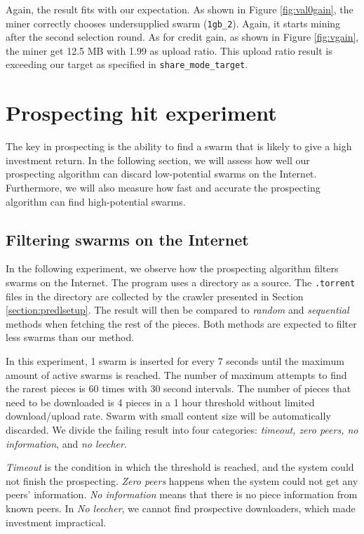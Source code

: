 Again, the result fits with our expectation. As shown in Figure \ref{fig:val0gain}, the miner correctly chooses undersupplied swarm (\texttt{1gb\_2}). Again, it starts mining after the second selection round. As for credit gain, as shown in Figure \ref{fig:vgain}, the miner get 12.5 MB with 1.99 as upload ratio. This upload ratio result is exceeding our target as specified in \texttt{share\_mode\_target}. 
\vspace{-0.3cm}
\section{Prospecting hit experiment}
\label{section:prospectexp}
The key in prospecting is the ability to find a swarm that is likely to give a high investment return. In the following section, we will assess how well our prospecting algorithm can discard low-potential swarms on the Internet. Furthermore, we will also measure how fast and accurate the prospecting algorithm can find high-potential swarms. 

\subsection{Filtering swarms on the Internet}
\label{section:filterinetexp}
In the following experiment, we observe how the prospecting algorithm filters swarms on the Internet. The program uses a directory as a source. The \texttt{.torrent} files in the directory are collected by the crawler presented in Section \ref{section:predlsetup}. The result will then be compared to \textit{random} and \textit{sequential} methods when fetching the rest of the pieces. Both methods are expected to filter less swarms than our method.


In this experiment, 1 swarm is inserted for every 7 seconds until the maximum amount of active swarms is reached. The number of maximum attempts to find the rarest pieces is 60 times with 30 second intervals. The number of pieces that need to be downloaded is 4 pieces in a 1 hour threshold without limited download/upload rate. Swarm with small content size will be automatically discarded. We divide the failing result into four categories: \textit{timeout, zero peers, no information}, and \textit{no leecher}.

\textit{Timeout} is the condition in which the threshold is reached, and the system could not finish the prospecting. \textit{Zero peers} happens when the system could not get any peers' information. \textit{No information} means that there is no piece information from known peers. In \textit{No leecher}, we cannot find prospective downloaders, which made investment impractical. 

